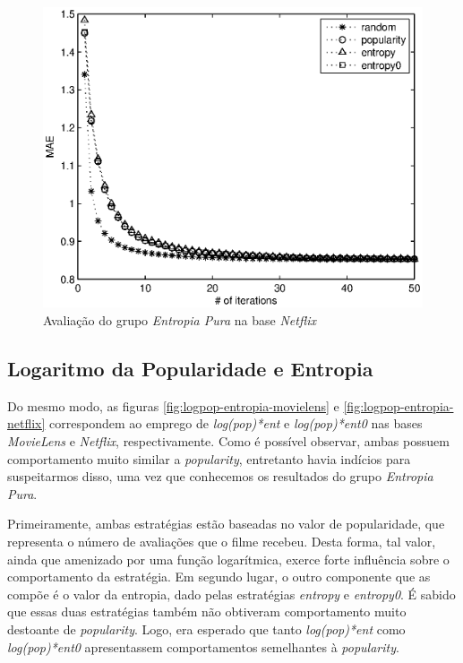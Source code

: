 \begin{figure}[ht]
\centering
\includegraphics{nf_ent_ent0.eps}
\caption{Avaliação do grupo \textit{Entropia Pura} na base \textit{Netflix}}
\label{fig:entropia-pura-netflix}
\end{figure}

\subsection{Logaritmo da Popularidade e Entropia}

Do mesmo modo, as figuras \ref{fig:logpop-entropia-movielens} e \ref{fig:logpop-entropia-netflix} correspondem ao emprego de \textit{log(pop)*ent} e \textit{log(pop)*ent0} nas bases \textit{MovieLens} e \textit{Netflix}, respectivamente. Como é possível observar, ambas possuem comportamento muito similar a \textit{popularity}, entretanto havia indícios para suspeitarmos disso, uma vez que conhecemos os resultados do grupo \textit{Entropia Pura}.

Primeiramente, ambas estratégias estão baseadas no valor de popularidade, que representa o número de avaliações que o filme recebeu. Desta forma, tal valor, ainda que amenizado por uma função logarítmica, exerce forte influência sobre o comportamento da estratégia. Em segundo lugar, o outro componente que as compõe é o valor da entropia, dado pelas estratégias \textit{entropy} e \textit{entropy0}. É sabido que essas duas estratégias também não obtiveram comportamento muito destoante de \textit{popularity}. Logo, era esperado que tanto \textit{log(pop)*ent} como \textit{log(pop)*ent0} apresentassem comportamentos semelhantes à \textit{popularity}.

